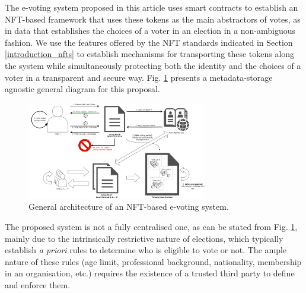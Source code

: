 \documentclass[../main.tex]{subfiles}
\begin{document}
The e-voting system proposed in this article uses smart contracts to establish an NFT-based framework that uses these tokens as the main abstractors of votes, as in data that establishes the choices of a voter in an election in a non-ambiguous fashion. We use the features offered by the NFT standards indicated in Section \ref{introduction_nfts} to establish mechanisms for transporting these tokens along the system while simultaneously protecting both the identity and the choices of a voter in a transparent and secure way. Fig. \ref{fig:general_architecture} presents a metadata-storage agnostic general diagram for this proposal.

\begin{figure}[htp]
    \centering
    \includegraphics[width=0.7\textwidth]{../Images/01_general_solution.png}
    \caption{General architecture of an NFT-based e-voting system.}
    \label{fig:general_architecture}
\end{figure}

The proposed system is not a fully centralised one, as can be stated from Fig. \ref{fig:general_architecture}, mainly due to the intrinsically restrictive nature of elections, which typically establish \textit{a priori} rules to determine who is eligible to vote or not. The ample nature of these rules (age limit, professional background, nationality, membership in an organisation, etc.) requires the existence of a trusted third party to define and enforce them.
\end{document}

